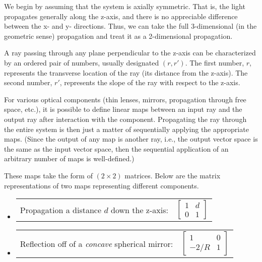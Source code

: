 \documentclass[fleqn]{article}
\begin{document}
\begin{enumerate}[nolistsep]
			We begin by assuming that the system is axially symmetric. That is, the light propagates generally along the z-axis, and there is no appreciable difference between the x- and y- directions. Thus, we can take the full 3-dimensional (in the geometric sense) propagation and treat it as a 2-dimensional propagation.

			A ray passing through any plane perpendicular to the z-axis can be characterized by an ordered pair of numbers, usually designated $(r, r')$. The first number, $r$, represents the transverse location of the ray (its distance from the z-axis). The second number, $r'$, represents the slope of the ray with respect to the z-axis.
			
			For various optical components (thin lenses, mirrors, propagation through free space, etc.), it is possible to define linear maps between an input ray and the output ray after interaction with the component. Propagating the ray through the entire system is then just a matter of sequentially applying the appropriate maps. (Since the output of any map is another ray, i.e., the output vector space is the same as the input vector space, then the sequential application of an arbitrary number of maps is well-defined.)
			
			These maps take the form of $(2 \times 2)$ matrices. Below are the matrix representations of two maps representing different components.
			
			\begingroup
			\renewcommand*{\arraystretch}{0.6}
			\begin{itemize}
				\item
					\begin{tabularx}{0.85\textwidth}{>{\hsize=0.75\hsize}X >{\hsize=0.25\hsize}X}
						Propagation a distance $d$ down the z-axis: & $\begin{bmatrix}
							1 & d\\
							0 & 1
							\end{bmatrix}$
					\end{tabularx}
					
				\item
					\begin{tabularx}{0.85\textwidth}{>{\hsize=0.75\hsize}X  >{\hsize=0.25\hsize}X}
						Reflection off of a \textit{concave} spherical mirror: & $\begin{bmatrix}
							 1   & 0\\
							-2/R & 1
							\end{bmatrix}$
					\end{tabularx}
					

\end{itemize}
\end{enumerate}
\end{document}
